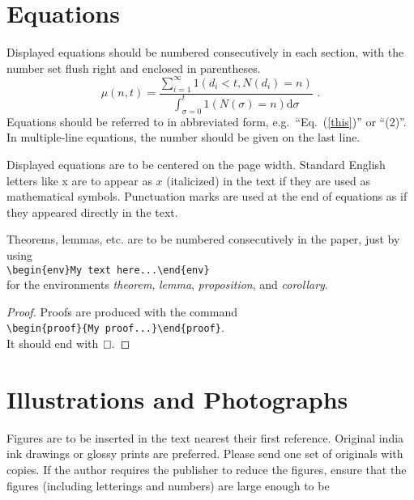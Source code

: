 \documentclass[11pt,twoside]{article}
\begin{document}
\begin{multicols}{2}
\section{Equations}

Displayed equations should be numbered consecutively in each
section, with the number set flush right and enclosed in
parentheses.
\begin{equation}
\mu(n,t) = \dfrac{\sum^\infty_{i=1} 1(d_i < t, N(d_i) = n)}
{\int^t_{\sigma=0} 1(N(\sigma) = n)\mathrm{d}\sigma}\,\, .
\label{this}
\end{equation}
Equations should be referred to in abbreviated form,
e.g.~``Eq.~(\ref{this})'' or ``(2)''. In multiple-line equations,
the number should be given on the last line.

Displayed equations are to be centered on the page width.
Standard English letters like x are to appear as $x$ (italicized)
in the text if they are used as mathematical symbols. Punctuation
marks are used at the end of equations as if they appeared directly in the text.

\begin{theorem}
Theorems, lemmas, etc. are to be numbered consecutively in the
paper, just by using \\
\verb+\begin{env}My text here...\end{env}+\\
for the environments \emph{theorem}, \emph{lemma},
\emph{proposition}, and \emph{corollary}.\\
\end{theorem}

\vspace*{-5pt}

\begin{proof}
Proofs are produced with the command\\
\verb+\begin{proof}{My proof...}\end{proof}+.\\
It should end with\ $\qed$\kern0.3pt.
\end{proof}

\section{Illustrations and Photographs}

Figures are to be inserted in the text nearest their first reference.
Original india ink drawings or glossy prints are preferred. Please
send one set of originals with copies. If the author requires the
publisher to reduce the figures, ensure that {the figures (including
letterings and numbers) are large enough to be\hfilneg}


\end{multicols}
\end{document}
